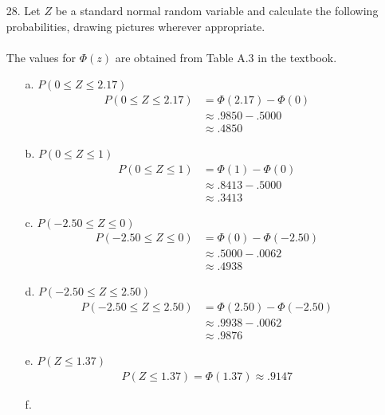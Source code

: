 \documentclass[letterpaper,12pt]{article}
\begin{document}
\maketitle

\begin{enumerate}
  \item[28.]
    Let $Z$ be a standard normal random variable and calculate the following probabilities, drawing pictures wherever appropriate. \\
    \\
    The values for $\Phi(z)$ are obtained from Table A.3 in the textbook.
    \begin{enumerate}
      \item[a.]
        $P(0 \le Z \le 2.17)$
        \begin{align*}
          P(0 \le Z \le 2.17) &= \Phi(2.17) - \Phi(0) \\
          &\approx .9850 - .5000 \\
          &\approx .4850
        \end{align*}
      \item[b.]
        $P(0 \le Z \le 1)$
        \begin{align*}
          P(0 \le Z \le 1) &= \Phi(1) - \Phi(0) \\
          &\approx .8413 - .5000 \\
          &\approx .3413
        \end{align*}
      \item[c.]
        $P(-2.50 \le Z \le 0)$
        \begin{align*}
          P(-2.50 \le Z \le 0) &= \Phi(0) - \Phi(-2.50) \\
          &\approx .5000 - .0062 \\
          &\approx .4938
        \end{align*}
      \item[d.]
        $P(-2.50 \le Z \le 2.50)$
        \begin{align*}
          P(-2.50 \le Z \le 2.50) &= \Phi(2.50) - \Phi(-2.50) \\
          &\approx .9938 - .0062 \\
          &\approx .9876
        \end{align*}
      \item[e.]
        $P(Z \le 1.37)$
        \begin{align*}
          P(Z \le 1.37) = \Phi(1.37) \approx .9147
        \end{align*}
      \item[f.]

\end{enumerate}
\end{enumerate}
\end{document}
